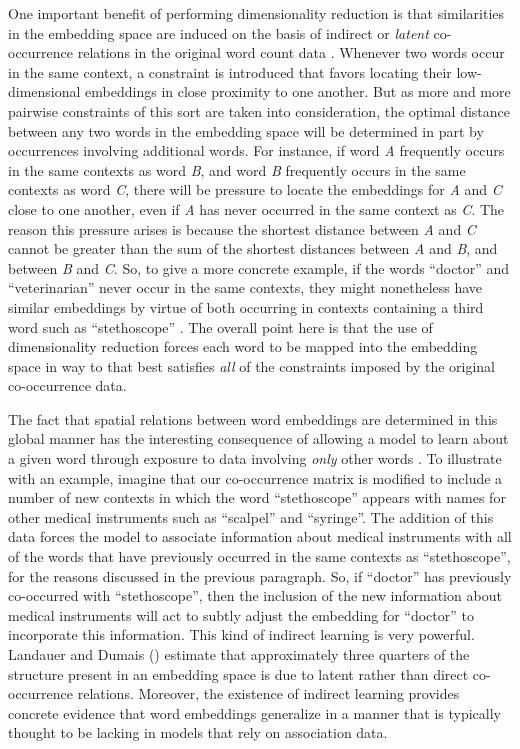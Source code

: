 One important benefit of performing dimensionality reduction is that similarities in the embedding space are induced on the basis of indirect or \textit{latent} co-occurrence relations in the original word count data \citep{TurneyPantel:2010,LandauerDumais:1997,JonesMewhort:2007}. Whenever two words occur in the same context, a constraint is introduced that favors locating their low-dimensional embeddings in close proximity to one another. But as more and more pairwise constraints of this sort are taken into consideration, the optimal distance between any two words in the embedding space will be determined in part by occurrences involving additional words. For instance, if word \textit{A} frequently occurs in the same contexts as word \textit{B}, and word \textit{B} frequently occurs in the same contexts as word \textit{C}, there will be pressure to locate the embeddings for \textit{A} and \textit{C} close to one another, even if \textit{A} has never occurred in the same context as \textit{C}. The reason this pressure arises is because the shortest distance between \textit{A} and \textit{C} cannot be greater than the sum of the shortest distances between \textit{A} and \textit{B}, and between \textit{B} and \textit{C}. So, to give a more concrete example, if the words ``doctor'' and ``veterinarian'' never occur in the same contexts, they might nonetheless have similar embeddings by virtue of both occurring in contexts containing a third word such as ``stethoscope'' \citep{LandauerDumais:1997,JonesMewhort:2007}. The overall point here is that the use of dimensionality reduction forces each word to be mapped into the embedding space in way to that best satisfies \textit{all} of the constraints imposed by the original co-occurrence data.

The fact that spatial relations between word embeddings are determined in this global manner has the interesting consequence of allowing a model to learn about a given word through exposure to data involving \textit{only} other words \citep{LandauerDumais:1997}. To illustrate with an example, imagine that our co-occurrence matrix is modified to include a number of new contexts in which the word ``stethoscope'' appears with names for other medical instruments such as ``scalpel'' and ``syringe''. The addition of this data forces the model to associate information about medical instruments with all of the words that have previously occurred in the same contexts as ``stethoscope'', for the reasons discussed in the previous paragraph. So, if ``doctor'' has previously co-occurred with ``stethoscope'', then the inclusion of the new information about medical instruments will act to subtly adjust the embedding for ``doctor'' to incorporate this information. This kind of indirect learning is very powerful. Landauer and Dumais (\citeyear[][pp. 223-26]{LandauerDumais:1997}) estimate that approximately three quarters of the structure present in an embedding space is due to latent rather than direct co-occurrence relations. Moreover, the existence of indirect learning provides concrete evidence that word embeddings generalize in a manner that is typically thought to be lacking in models that rely on association data.

